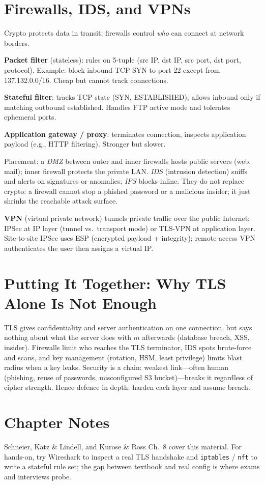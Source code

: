 \section{Firewalls, IDS, and VPNs}\label{sec:firewalls}
Crypto protects data in transit; firewalls control \emph{who} can connect at network borders.

\textbf{Packet filter} (stateless): rules on 5-tuple (src IP, dst IP, src port, dst port, protocol). Example: block inbound TCP SYN to port 22 except from 137.132.0.0/16. Cheap but cannot track connections.

\textbf{Stateful filter}: tracks TCP state (SYN, ESTABLISHED); allows inbound only if matching outbound established. Handles FTP active mode and tolerates ephemeral ports.

\textbf{Application gateway / proxy}: terminates connection, inspects application payload (e.g., HTTP filtering). Stronger but slower.

Placement: a \emph{DMZ} between outer and inner firewalls hosts public servers (web, mail); inner firewall protects the private LAN. \emph{IDS} (intrusion detection) sniffs and alerts on signatures or anomalies; \emph{IPS} blocks inline. They do not replace crypto: a firewall cannot stop a phished password or a malicious insider; it just shrinks the reachable attack surface.

\textbf{VPN} (virtual private network) tunnels private traffic over the public Internet: IPSec at IP layer (tunnel vs.\ transport mode) or TLS-VPN at application layer. Site-to-site IPSec uses ESP (encrypted payload + integrity); remote-access VPN authenticates the user then assigns a virtual IP.

\section{Putting It Together: Why TLS Alone Is Not Enough}\label{sec:together}
TLS gives confidentiality and server authentication on one connection, but says nothing about what the server does with $m$ afterwards (database breach, XSS, insider). Firewalls limit who reaches the TLS terminator, IDS spots brute-force and scans, and key management (rotation, HSM, least privilege) limits blast radius when a key leaks. Security is a chain: weakest link---often human (phishing, reuse of passwords, misconfigured S3 bucket)---breaks it regardless of cipher strength. Hence defence in depth: harden each layer and assume breach.

\section{Chapter Notes}
Schneier, Katz \& Lindell, and Kurose \& Ross Ch.~8 cover this material. For hands-on, try Wireshark to inspect a real TLS handshake and \texttt{iptables} / \texttt{nft} to write a stateful rule set; the gap between textbook and real config is where exams and interviews probe.


